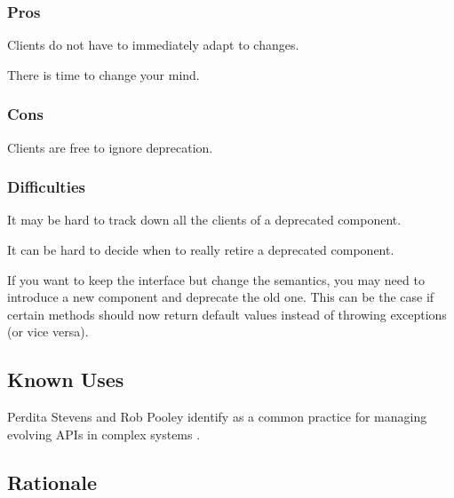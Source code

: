 \documentclass[a4paper,10pt,twoside]{book}
\begin{document}
\subsubsection*{Pros}

\begin{bulletlist}
\item Clients do not have to immediately adapt to changes.

\item There is time to change your mind.
\end{bulletlist}

\subsubsection*{Cons}

\begin{bulletlist}
\item Clients are free to ignore deprecation.
\end{bulletlist}

\subsubsection*{Difficulties}

\begin{bulletlist}
\item It may be hard to track down all the clients of a deprecated component.

\item It can be hard to decide when to really retire a deprecated component.

\item If you want to keep the interface but change the semantics, you may need to introduce a new component and deprecate the old one. This can be the case if certain methods should now return default values instead of throwing exceptions (or vice versa).
\end{bulletlist}

\subsection*{Known Uses}

Perdita Stevens and Rob Pooley identify  as a common practice for managing evolving APIs in complex systems \cite{Stev98a}.

\subsection*{Rationale}
\end{document}
